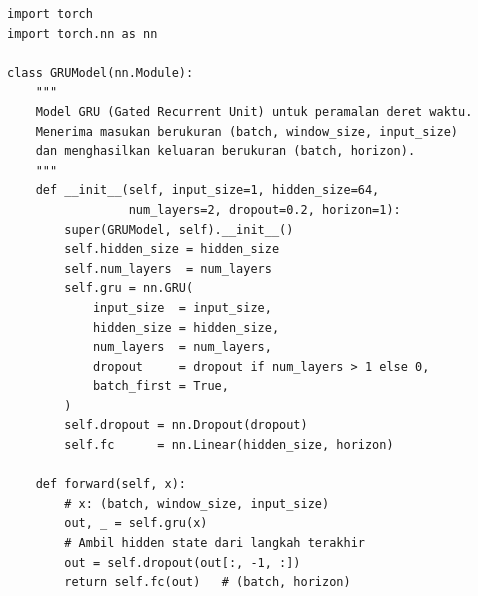 \begin{lstlisting}[caption={Implementasi Arsitektur Model GRU menggunakan PyTorch}, label={lst:gru-model}, style=pythonstyle]
import torch
import torch.nn as nn

class GRUModel(nn.Module):
    """
    Model GRU (Gated Recurrent Unit) untuk peramalan deret waktu.
    Menerima masukan berukuran (batch, window_size, input_size)
    dan menghasilkan keluaran berukuran (batch, horizon).
    """
    def __init__(self, input_size=1, hidden_size=64,
                 num_layers=2, dropout=0.2, horizon=1):
        super(GRUModel, self).__init__()
        self.hidden_size = hidden_size
        self.num_layers  = num_layers
        self.gru = nn.GRU(
            input_size  = input_size,
            hidden_size = hidden_size,
            num_layers  = num_layers,
            dropout     = dropout if num_layers > 1 else 0,
            batch_first = True,
        )
        self.dropout = nn.Dropout(dropout)
        self.fc      = nn.Linear(hidden_size, horizon)

    def forward(self, x):
        # x: (batch, window_size, input_size)
        out, _ = self.gru(x)
        # Ambil hidden state dari langkah terakhir
        out = self.dropout(out[:, -1, :])
        return self.fc(out)   # (batch, horizon)
\end{lstlisting}
